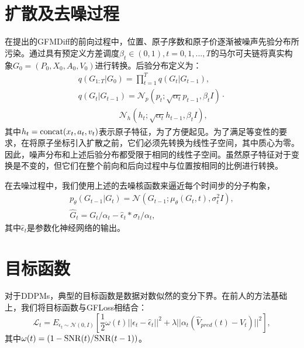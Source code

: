 \section{扩散及去噪过程}

在提出的GFMDiff的前向过程中，位置、原子序数和原子价逐渐被噪声先验分布所污染。通过具有预定义方差调度$\beta_t \in (0, 1), t=0, 1, ..., T$的马尔可夫链将真实构象$G_0 = (P_0, X_0, A_0, V_0)$进行转换。后验分布定义为：
\begin{eqnarray}
    &q(G_{1:T}|G_0) = \prod^T_{t=1} q(G_t|G_{t-1}),& \\
    &q(G_t|G_{t-1}) = \mathcal{N}_p(p_t;\sqrt{\alpha_t} p_{t-1}, \beta_t I) \cdot \\
    & \quad \quad \quad \quad \quad \mathcal{N}_h(h_t;\sqrt{\alpha_t} h_{t-1}, \beta_t I),&
\end{eqnarray}
其中$h_t = {\rm concat}(x_t, a_t, v_t)$表示原子特征，为了方便起见。为了满足等变性的要求，在将原子坐标引入扩散之前，它们必须先转换为线性子空间，其中质心为零\cite{enf_satorras_21,edm_hoogeboom_22,geodiff_xu_22}。因此，噪声分布和上述后验分布都受限于相同的线性子空间。虽然原子特征对于变换是不变的，但它们在整个前向和后向过程中与位置按相同的比例进行转换。

在去噪过程中，我们使用上述的去噪核函数来逼近每个时间步的分子构象，
\begin{eqnarray}
    &p_\theta(G_{t-1}|G_t) = \mathcal{N}(G_{t-1}; \mu_\theta(G_t,t),\sigma_t^2 I),& \\
    &\hat{G}_t = G_t / \alpha_t - \hat{\epsilon}_t * \sigma_t / \alpha_t ,&
\end{eqnarray}
其中$\hat{\epsilon}_t$是参数化神经网络的输出。

\section{目标函数}

对于DDPMs，典型的目标函数是数据对数似然的变分下界。在前人的方法基础上，我们将目标函数与GFLoss相结合：
\begin{equation}
    \mathcal{L}_t = E_{\epsilon_t \sim \mathcal{N}(0, I)}[\frac{1}{2}\omega(t)||\epsilon_t - \hat{\epsilon}_t||^2 + \lambda ||\alpha_t(\hat{V}_{pred}(t) - V_t)||^2],
\end{equation}
其中$\omega(t) = (1-{\rm SNR}(t)/{\rm SNR}(t-1))$。
